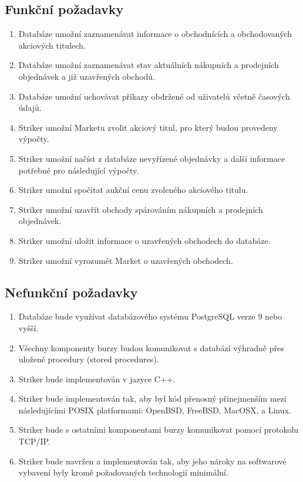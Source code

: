 \documentclass[thesis=M,czech]{FITthesis}[2012/06/26]
\begin{document}
\subsection{Funkční požadavky}

\begin{enumerate}
	\item Databáze umožní zaznamenávat informace o obchodnících a obchodovaných akciových titulech.
	\item Databáze umožní zaznamenávat stav aktuálních nákupních a prodejních objednávek a již uzavřených obchodů.
	\item Databáze umožní uchovávat příkazy obdržené od uživatelů včetně časových údajů.
	\item Striker umožní Marketu zvolit akciový titul, pro který budou provedeny výpočty.
	\item Striker umožní načíst z databáze nevyřízené objednávky a další informace potřebné pro následující výpočty.
	\item Striker umožní spočítat aukční cenu zvoleného akciového titulu.
	\item Striker umožní uzavřít obchody spárováním nákupních a prodejních objednávek.
	\item Striker umožní uložit informace o uzavřených obchodech do databáze.
	\item Striker umožní vyrozumět Market o uzavřených obchodech.
\end{enumerate}


\subsection{Nefunkční požadavky}

\begin{enumerate}
	\item Databáze bude využívat databázového systému PostgreSQL verze 9 nebo vyšší.
	\item Všechny komponenty burzy budou komunikovat s databází výhradně přes uložené procedury (stored procedures). 
	\item Striker bude implementován v jazyce C++.
	\item Striker bude implementován tak, aby byl kód přenosný přinejmenším mezi následujícími POSIX platformami: OpenBSD, 
		FreeBSD, MacOSX, a Linux.
	\item Striker bude s ostatními komponentami burzy komunikovat pomocí protokolu TCP/IP.
	\item Striker bude navržen a implementován tak, aby jeho nároky na softwarové vybavení byly kromě požadovaných technologií minimální.
\end{enumerate}
\end{document}

